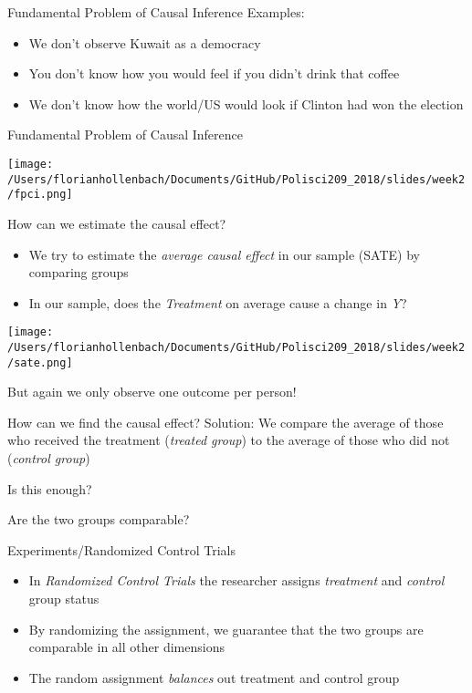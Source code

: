 \documentclass[presentation]{beamer}
\begin{document}
\begin{frame}[label={sec:org08476c0}]{Fundamental Problem of Causal Inference}
Examples:

\begin{itemize}
\item We don't observe Kuwait as a democracy
\item You don't know how you would feel if you didn't drink that coffee
\item We don't know how the world/US would look if Clinton had won the election
\end{itemize}
\end{frame}



\begin{frame}[label={sec:org687459f}]{Fundamental Problem of Causal Inference}
\begin{center}
\texttt{[image: /Users/florianhollenbach/Documents/GitHub/Polisci209\_2018/slides/week2/fpci.png]}
\end{center}
\end{frame}


\begin{frame}[label={sec:org53a0836}]{How can we estimate the causal effect?}
\begin{itemize}
\item We try to estimate the \emph{average causal effect} in our sample (SATE) by comparing groups
\item In our sample, does the \emph{Treatment} on average cause a change in \emph{Y}?
\end{itemize}
\pause
\begin{center}
\texttt{[image: /Users/florianhollenbach/Documents/GitHub/Polisci209\_2018/slides/week2/sate.png]}
\end{center}
But again we only observe one outcome per person!
\end{frame}

\begin{frame}[label={sec:org34fc1d0}]{How can we find the causal effect?}
Solution: We compare the average of those who received the treatment (\emph{treated group}) to the average of those who did not (\emph{control group})
\pause


Is this enough?

\pause
Are the two groups comparable?
\end{frame}


\begin{frame}[label={sec:orgad59a72}]{Experiments/Randomized Control Trials}
\begin{itemize}
\item In \emph{Randomized Control Trials} the researcher assigns \emph{treatment} and \emph{control} group status
\end{itemize}
\pause
\begin{itemize}
\item By randomizing the assignment, we guarantee that the two groups are comparable in all other dimensions
\item The random assignment \emph{balances} out treatment and control group
\end{itemize}
\end{frame}
\end{document}
